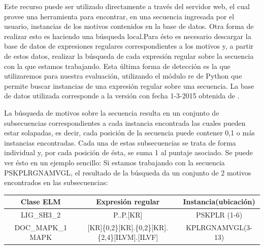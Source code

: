 Este recurso puede ser utilizado directamente a través del servidor web\cite{elmweb}, el cual provee una herramienta para encontrar, en una secuencia ingresada por el usuario, instancias de los motivos contenidos en la base de datos.
Otra forma de realizar esto es haciendo una búsqueda local.Para ésto es necesario descargar la base de datos de expresiones regulares correspondientes a los motivos y, 
a partir de estos datos, realizar la búsqueda de cada expresión regular sobre la secuencia con la que estamos trabajando.
Esta última forma de detección es la que utilizaremos para nuestra evaluación, utilizando el módulo re de Python que permite buscar instancias de una expresión regular sobre una secuencia.
La base de datos utilizada corresponde a la versión con fecha 1-3-2015 obtenida de \cite{elmweb}.

La búsqueda de motivos sobre la secuencia resulta en un conjunto de subsecuencias correspondientes a cada instancia encontrada las cuales pueden estar solapadas, es decir, 
cada posición de la secuencia puede contener 0,1 o más instancias encontradas. 
Cada una de estas subsecuencias se trata de forma individual y, por cada posición de ésta, se suma 1 al puntaje asociado.
Se puede ver ésto en un ejemplo sencillo:
Si estamos trabajando con la secuencia PSKPLRGNAMVGL, el resultado de la búsqueda da un conjunto de 2 motivos encontrados en las subsecuencias:
% 
\vspace{0.5cm}

\noindent 
\begin{tabular}{c|c|c} 
\textbf{Clase ELM} & \textbf{Expresión regular} & \textbf{Instancia(ubicación)}\\ \hline
LIG\_SH3\_2 & P..P.[KR] & PSKPLR (1-6)\\ 
DOC\_MAPK\_1 MAPK  & [KR]\{0,2\}[KR].\{0,2\}[KR].\{2,4\}[ILVM].[ILVF] & KPLRGNAMVGL(3-13)
\end{tabular}

\vspace{0.5cm}


